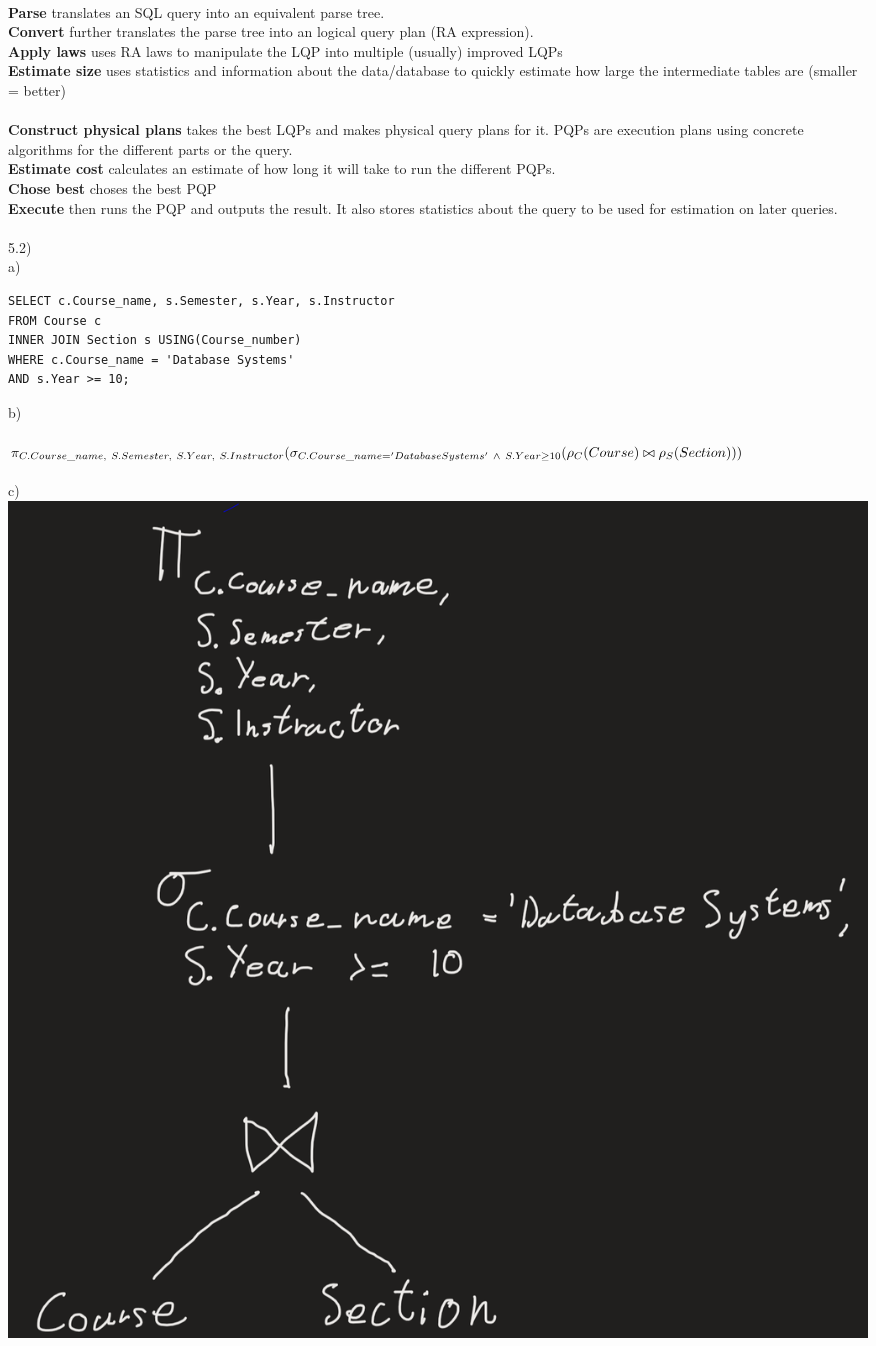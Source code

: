 \documentclass[12pt, letterpaper, twoside]{article}
\begin{document}
\\
\textbf{Parse} translates an SQL query into an equivalent parse tree.\\
\textbf{Convert} further translates the parse tree into an logical query plan (RA expression).\\
\textbf{Apply laws} uses RA laws to manipulate the LQP into multiple (usually) improved LQPs\\
\textbf{Estimate size} uses statistics and information about the data/database to quickly estimate how large the intermediate tables are (smaller = better)\\
\newpage
\ \\
\textbf{Construct physical plans} takes the best LQPs and makes physical query plans for it. PQPs are execution plans using concrete algorithms for the different parts or the query.\\
\textbf{Estimate cost} calculates an estimate of how long it will take to run the different PQPs.\\
\textbf{Chose best} choses the best PQP\\
\textbf{Execute} then runs the PQP and outputs the result. It also stores statistics about the query to be used for estimation on later queries.\\     
\newpage
\ \\
5.2)\\
a)
\begin{verbatim}
SELECT c.Course_name, s.Semester, s.Year, s.Instructor
FROM Course c
INNER JOIN Section s USING(Course_number)
WHERE c.Course_name = 'Database Systems'
AND s.Year >= 10;
\end{verbatim}
b)\\
\\
$
\pi_{C.Course\_name,\ S.Semester,\ S.Year,\ S.Instructor}(\\
\sigma_{C.Course\_name = 'Database Systems'\ \wedge\ S.Year \geq 10}(\rho_C(Course) \bowtie \rho_S(Section)))
$\\
\\
c)\\
\includegraphics[scale=0.5]{"5c.png"}
\end{document}
